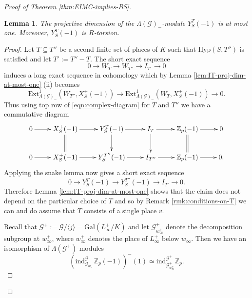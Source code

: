 \documentclass[12pt]{amsart}
\theoremstyle{plain}
\newtheorem{lemma}[theorem]{Lemma}
\theoremstyle{remark}
\theoremstyle{definition}
\numberwithin{equation}{section}
\begin{document}
{\begin{proof}[Proof of Theorem \ref{thm:EIMC-implies-BS}]
\begin{lemma}\label{lem:YST(-1)-has-proj-dim-at-most-one}
The projective dimension of the $\Lambda(\mathcal{G})_{-}$-module $Y_{S}^{T} (-1)$ is at most one.
Moreover, $Y_{S}^{T} (-1)$ is $R$-torsion.
\end{lemma}

\begin{proof}
Let $T \subseteq T''$ be a second finite set of places of $K$ such that ${\mathrm{Hyp}}(S,T'')$ is satisfied and let $T':=T''-T$.
The short exact sequence
\[
0 \longrightarrow W_{T} \longrightarrow W_{T''} \longrightarrow I_{T'} \longrightarrow 0
\]
induces a long exact sequence in cohomology which by Lemma \ref{lem:IT-proj-dim-at-most-one} (ii) becomes
\[
{\mathrm{Ext}}^{1}_{\Lambda(\mathcal{G})_{-}}(W_{T''},X_{S}^{+}(-1)) 
\longrightarrow {\mathrm{Ext}}^{1}_{\Lambda(\mathcal{G})_{-}}(W_{T},X_{S}^{+}(-1)) \longrightarrow 0.
\]
Thus using top row of \eqref{eqn:complex-diagram} for $T$ and $T''$
we have a commutative diagram 
\begin{equation*}\label{eqn:change-of-Ts} 
\xymatrix{
{0} \ar[r] & X_{S}^{+} (-1) \ar[r] \ar@{=}[d] & Y_{S}^{T}(-1) \ar[r] \ar[d] &
I_{T} \ar[r] \ar[d] & {\mathbb{Z}}_{p}(-1) \ar[r] \ar@{=}[d] & 0\\
{0} \ar[r] & X_{S}^{+} (-1) \ar[r] &  Y_{S}^{T''}(-1)  \ar[r] &
I_{T''} \ar[r] &  {\mathbb{Z}}_{p}(-1) \ar[r] & 0.
}
\end{equation*}
Applying the snake lemma now gives a short exact sequence
\[
0 \longrightarrow Y_{S}^{T} (-1) \longrightarrow Y_{S}^{T''} (-1) \longrightarrow I_{T'} \longrightarrow 0.
\]
Therefore Lemma \ref{lem:IT-proj-dim-at-most-one} shows that the claim does not depend on the particular choice of $T$ and so by Remark \ref{rmk:conditions-on-T} we can and do assume that $T$ consists of a single place $v$.

Recall that $\mathcal{G}^{+} := \mathcal{G} / \langle j \rangle= {\mathrm{Gal}}(L_{\infty}^{+}/K)$ and let $\mathcal{G}^{+}_{w_{\infty}^{+}}$
denote the decomposition subgroup at $w_{\infty}^{+}$,
where $w_{\infty}^{+}$ denotes the place of $L_{\infty}^{+}$ below $w_{\infty}$. 
Then we have an isomorphism of $\Lambda(\mathcal{G}^{+})$-modules
\begin{equation} \label{eqn:ind-Zp-iso}
({\mathrm{ind}}_{\mathcal{G}_{w_{\infty}}}^{\mathcal{G}} {\mathbb{Z}}_{p}(-1))^{-}(1) \simeq {\mathrm{ind}}_{\mathcal{G}^{+}_{w^{+}_{\infty}}}^{\mathcal{G}^{+}} {\mathbb{Z}}_{p}.
\end{equation}


\end{proof}
\end{proof}}
\end{document}
